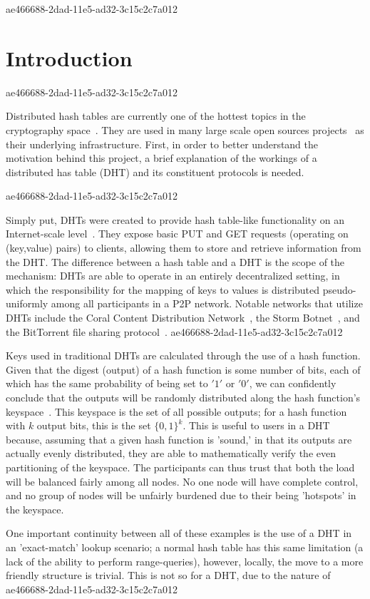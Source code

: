 \documentclass[12pt]{article}
\begin{document}
ae466688-2dad-11e5-ad32-3c15c2c7a012\section{Introduction}
ae466688-2dad-11e5-ad32-3c15c2c7a012\par Distributed hash tables are currently one of the hottest topics in the cryptography space~\cite{Stoica:2001dj,Rowstron:2001ea,Ratnasamy:2001wn}. They are used in many large scale open sources projects~\cite{Freitas:2013tb,Xu:2010vs,Perfitt:2010fh} as their underlying infrastructure. First, in order to better understand the motivation behind this project, a brief explanation of the workings of a distributed has table (DHT) and its constituent protocols is needed.

ae466688-2dad-11e5-ad32-3c15c2c7a012\par Simply put, DHTs were created to provide hash table-like functionality on an Internet-scale level~\cite{Ratnasamy:2001wn}. They expose basic PUT and GET requests (operating on (key,value) pairs) to clients, allowing them to store and retrieve information from the DHT. The difference between a hash table and a DHT is the scope of the mechanism: DHTs are able to operate in an entirely decentralized setting, in which the responsibility for the mapping of keys to values is distributed pseudo-uniformly among all participants in a P2P network. Notable networks that utilize DHTs include the Coral Content Distribution Network~\cite{Freedman:2004vb}, the Storm Botnet~\cite{Holz:2008uk}, and the BitTorrent file sharing protocol~\cite{Cohen:y1_8mBnw}.
ae466688-2dad-11e5-ad32-3c15c2c7a012
\par Keys used in traditional DHTs are calculated through the use of a hash function. Given that the digest (output) of a hash function is some number of bits, each of which has the same probability of being set to $'1'$ or $'0'$, we can confidently conclude that the outputs will be randomly distributed along the hash function's keyspace~. This keyspace is the set of all possible outputs; for a hash function with $k$ output bits, this is the set $\{0,1\}^k$. This is useful to users in a DHT because, assuming that a given hash function is 'sound,' in that its outputs are actually evenly distributed, they are able to mathematically verify the even partitioning of the keyspace. The participants can thus trust that both the load will be balanced fairly among all nodes. No one node will have complete control, and no group of nodes will be unfairly burdened due to their being 'hotspots' in the keyspace.~

\par One important continuity between all of these examples is the use of a DHT in an 'exact-match' lookup scenario; a normal hash table has this same limitation (a lack of the ability to perform range-queries), however, locally, the move to a more friendly structure is trivial. This is not so for a DHT, due to the nature of
\printbibliography
ae466688-2dad-11e5-ad32-3c15c2c7a012
\end{document}
